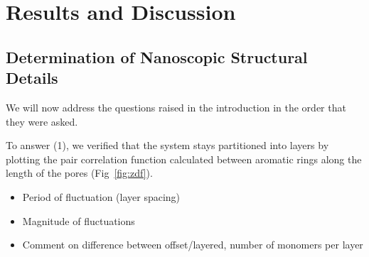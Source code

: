 \documentclass{article}
\begin{document}
  \section*{Results and Discussion}
  
  \subsection*{Determination of Nanoscopic Structural Details}
  
  
  We will now address the questions raised in the introduction in the order
  that they were asked.

  To answer (1), we verified that the system stays partitioned into layers by
  plotting the pair correlation function calculated between aromatic rings along
  the length of the pores (Fig~\ref{fig:zdf}).
  \begin{itemize}
	\item Period of fluctuation (layer spacing)
        \item Magnitude of fluctuations
	\item Comment on difference between offset/layered, number of monomers per layer
  \end{itemize} 	
\end{document}
